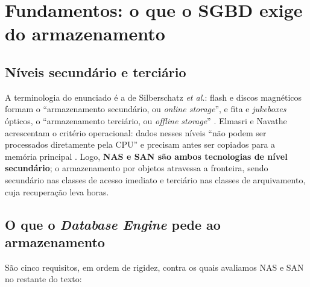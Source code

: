 \documentclass[11pt,a4paper]{article}
\begin{document}
\section{Fundamentos: o que o SGBD exige do armazenamento}
\label{sec:fundamentos}

\subsection{Níveis secundário e terciário}
\label{sec:hierarquia}

A terminologia do enunciado é a de Silberschatz \textit{et al.}: flash e discos magnéticos formam o
``armazenamento secundário, ou \textit{online storage}'', e fita e \textit{jukeboxes} ópticos, o
``armazenamento terciário, ou \textit{offline storage}'' \cite{silberschatz2020}. Elmasri e Navathe
acrescentam o critério operacional: dados nesses níveis ``não podem ser processados diretamente pela
CPU'' e precisam antes ser copiados para a memória principal \cite{elmasri2018}. Logo, \textbf{NAS e
SAN são ambos tecnologias de nível secundário}; o armazenamento por objetos atravessa a fronteira,
sendo secundário nas classes de acesso imediato e terciário nas classes de arquivamento, cuja
recuperação leva horas.

\subsection{O que o \textit{Database Engine} pede ao armazenamento}
\label{sec:engine}

São cinco requisitos, em ordem de rigidez, contra os quais avaliamos NAS e SAN no restante do texto:
\end{document}
